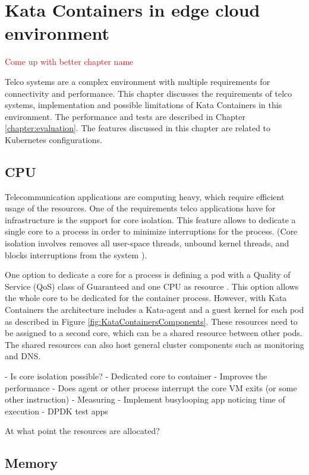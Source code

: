 \chapter{Kata Containers in edge cloud environment}
\label{chapter:implementation}

\textcolor{red}{Come up with better chapter name}

Telco systems are a complex environment with multiple requirements for connectivity and performance. This chapter discusses the requirements of telco systems, implementation and possible limitations of Kata Containers in this environment. The performance and tests are described in Chapter \ref{chapter:evaluation}. The features discussed in this chapter are related to Kubernetes configurations.

\section{CPU}

Telecommunication applications are computing heavy, which require efficient usage of the resources. One of the requirements telco applications have for infrastructure is the support for core isolation. This feature allows to dedicate a single core to a process in order to minimize interruptions for the process. (Core isolation involves removes all user-space threads, unbound kernel threads, and blocks interruptions from the system \cite{CPUisolation}).

One option to dedicate a core for a process is defining a pod with a Quality of Service (QoS) class of Guaranteed and one CPU as resource \cite{QOSKubernetes}. This option allows the whole core to be dedicated for the container process. However, with Kata Containers the architecture includes a Kata-agent and a guest kernel for each pod as described in Figure \ref{fig:KataContainersComponents}. These resources need to be assigned to a second core, which can be a shared resource between other pods. The shared resources can also host general cluster components such as monitoring and DNS.



- Is core isolation possible?
	- Dedicated core to container
		- Improves the performance
	- Does agent or other process interrupt the core VM exits (or some other instruction)
	- Measuring
		- Implement busylooping app noticing time of execution
		- DPDK test apps

At what point the resources are allocated?

\section{Memory}


